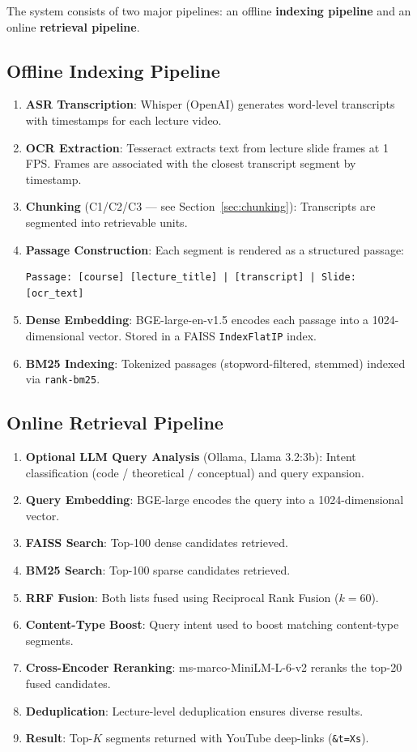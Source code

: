 \documentclass[12pt,a4paper]{article}
\begin{document}
The system consists of two major pipelines: an offline \textbf{indexing pipeline} and an online \textbf{retrieval pipeline}.

\subsection{Offline Indexing Pipeline}

\begin{enumerate}[leftmargin=1.5em]
  \item \textbf{ASR Transcription}: Whisper (OpenAI) generates word-level transcripts with timestamps for each lecture video.
  \item \textbf{OCR Extraction}: Tesseract extracts text from lecture slide frames at 1 FPS. Frames are associated with the closest transcript segment by timestamp.
  \item \textbf{Chunking} (C1/C2/C3 — see Section~\ref{sec:chunking}): Transcripts are segmented into retrievable units.
  \item \textbf{Passage Construction}: Each segment is rendered as a structured passage:
    \begin{lstlisting}
Passage: [course] [lecture_title] | [transcript] | Slide: [ocr_text]
    \end{lstlisting}
  \item \textbf{Dense Embedding}: BGE-large-en-v1.5 encodes each passage into a 1024-dimensional vector. Stored in a FAISS \texttt{IndexFlatIP} index.
  \item \textbf{BM25 Indexing}: Tokenized passages (stopword-filtered, stemmed) indexed via \texttt{rank-bm25}.
\end{enumerate}

\subsection{Online Retrieval Pipeline}

\begin{enumerate}[leftmargin=1.5em]
  \item \textbf{Optional LLM Query Analysis} (Ollama, Llama 3.2:3b): Intent classification (code / theoretical / conceptual) and query expansion.
  \item \textbf{Query Embedding}: BGE-large encodes the query into a 1024-dimensional vector.
  \item \textbf{FAISS Search}: Top-100 dense candidates retrieved.
  \item \textbf{BM25 Search}: Top-100 sparse candidates retrieved.
  \item \textbf{RRF Fusion}: Both lists fused using Reciprocal Rank Fusion ($k=60$).
  \item \textbf{Content-Type Boost}: Query intent used to boost matching content-type segments.
  \item \textbf{Cross-Encoder Reranking}: ms-marco-MiniLM-L-6-v2 reranks the top-20 fused candidates.
  \item \textbf{Deduplication}: Lecture-level deduplication ensures diverse results.
  \item \textbf{Result}: Top-$K$ segments returned with YouTube deep-links (\texttt{\&t=Xs}).
\end{enumerate}
\end{document}

